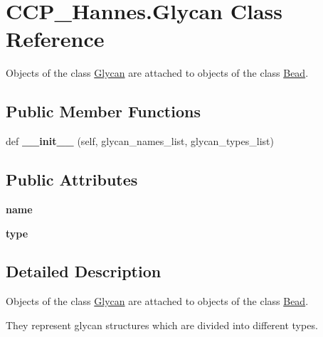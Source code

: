 \hypertarget{class_c_c_p___hannes_1_1_glycan}{}\section{C\+C\+P\+\_\+\+Hannes.\+Glycan Class Reference}
\label{class_c_c_p___hannes_1_1_glycan}


Objects of the class \mbox{\hyperlink{class_c_c_p___hannes_1_1_glycan}{Glycan}} are attached to objects of the class \mbox{\hyperlink{class_c_c_p___hannes_1_1_bead}{Bead}}.  


\subsection*{Public Member Functions}
\begin{DoxyCompactItemize}
\item 
\mbox{\label{class_c_c_p___hannes_1_1_glycan_aafa365a1d9370f65fed0715a7d1f6a54}} 
def {\bfseries \+\_\+\+\_\+init\+\_\+\+\_\+} (self, glycan\+\_\+names\+\_\+list, glycan\+\_\+types\+\_\+list)
\end{DoxyCompactItemize}
\subsection*{Public Attributes}
\begin{DoxyCompactItemize}
\item 
\mbox{\label{class_c_c_p___hannes_1_1_glycan_a0c2be33e3ba5593a639bd47f24bcc1c4}} 
{\bfseries name}
\item 
\mbox{\label{class_c_c_p___hannes_1_1_glycan_a097d262d25212abbc886ff25d90f10cc}} 
{\bfseries type}
\end{DoxyCompactItemize}


\subsection{Detailed Description}
Objects of the class \mbox{\hyperlink{class_c_c_p___hannes_1_1_glycan}{Glycan}} are attached to objects of the class \mbox{\hyperlink{class_c_c_p___hannes_1_1_bead}{Bead}}. 

They represent glycan structures which are divided into different types.


